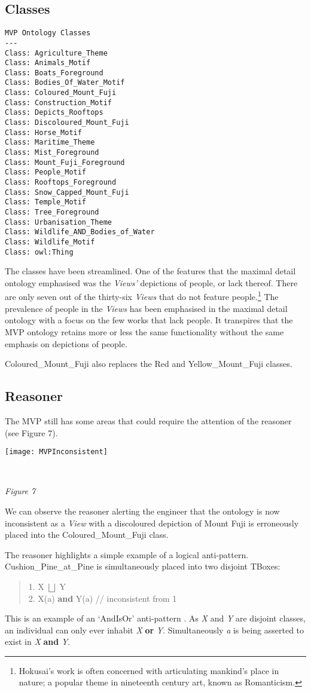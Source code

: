 \documentclass[titlepage,a4paper,12pt,oneside]{book}
\begin{document}
\subsection{Classes}
\begin{lstlisting}
MVP Ontology Classes
---
Class: Agriculture_Theme
Class: Animals_Motif
Class: Boats_Foreground
Class: Bodies_Of_Water_Motif
Class: Coloured_Mount_Fuji
Class: Construction_Motif
Class: Depicts_Rooftops
Class: Discoloured_Mount_Fuji
Class: Horse_Motif
Class: Maritime_Theme
Class: Mist_Foreground
Class: Mount_Fuji_Foreground
Class: People_Motif
Class: Rooftops_Foreground
Class: Snow_Capped_Mount_Fuji
Class: Temple_Motif
Class: Tree_Foreground
Class: Urbanisation_Theme
Class: Wildlife_AND_Bodies_of_Water
Class: Wildlife_Motif
Class: owl:Thing
\end{lstlisting}
The classes have been streamlined.
One of the features that the maximal detail ontology emphasised was the \textit{Views'} depictions of people, or lack thereof.
There are only seven out of the thirty-six \textit{Views} that do not feature people.\footnote{Hokusai's work is often concerned with articulating mankind's place in nature; a popular theme in nineteenth century art, known as Romanticism.}
The prevalence of people in the \textit{Views} has been emphasised in the maximal detail ontology with a focus on the few works that lack people.
It transpires that the MVP ontology retains more or less the same functionality without the same emphasis on depictions of people.\par
Coloured\_Mount\_Fuji also replaces the Red and Yellow\_Mount\_Fuji classes.

\subsection{Reasoner}
The MVP still has some areas that could require the attention of the reasoner (see Figure 7).
\newline
\centerline{\texttt{[image: MVPInconsistent]}}\\
\centerline{\textit{Figure 7}}
\newline
We can observe the reasoner alerting the engineer that the ontology is now inconsistent as a \textit{View} with a discoloured depiction of Mount Fuji is erroneously placed into the Coloured\_Mount\_Fuji class.\par
The reasoner highlights a simple example of a logical anti-pattern.
Cushion\_Pine\_at\_Pine is simultaneously placed into two disjoint TBoxes:
\begin{quote}
  1. X $\bigsqcup$ Y \\
  2. X(a) \textbf{and} Y(a) // inconsistent from 1
\end{quote}
This is an example of an `AndIsOr' anti-pattern \cite[1]{antipatterns2009}.
As \textit{X} and \textit{Y} are disjoint classes, an individual can only ever inhabit \textit{X} \textbf{or} \textit{Y}.
Simultaneously \textit{a} is being asserted to exist in \textit{X} \textbf{and} \textit{Y}.\par
\end{document}
